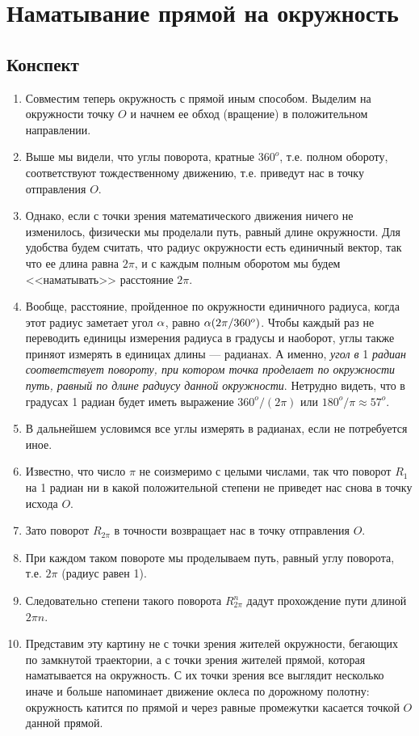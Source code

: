 \section{Наматывание прямой на окружность}

\subsection*{Конспект}
\begin{enumerate}\setlength{\itemsep}{1pt}
\item Совместим теперь окружность с прямой иным способом. Выделим на окружности точку $O$ и начнем ее обход (вращение) в положительном направлении.
\item Выше мы видели, что углы поворота, кратные $360^o$, т.е. полном обороту, соответствуют тождественному движению, т.е. приведут нас в точку отправления $O$.
\item Однако, если с точки зрения математического движения ничего не изменилось, физически мы проделали путь, равный длине окружности. Для удобства будем считать, что радиус окружности есть единичный вектор, так что ее длина равна $2\pi$, и с каждым полным оборотом мы будем <<наматывать>> расстояние $2\pi$.
\item Вообще, расстояние, пройденное по окружности единичного радиуса, когда этот радиус заметает угол $\alpha$, равно $\alpha(2\pi/360^o)$. Чтобы каждый раз не переводить единицы измерения радиуса в градусы и наоборот, углы также приняот измерять в единицах длины --- радианах. А именно, \textit{угол в} 1 \textit{радиан соответствует повороту, при котором точка проделает по окружности путь, равный по длине радиусу данной окружности}. Нетрудно видеть, что в градусах 1 радиан будет иметь выражение $360^o/(2\pi)$ или $180^o/\pi \approx 57^o$.
\item В дальнейшем условимся все углы измерять в радианах, если не потребуется иное.
\item Известно, что число $\pi$ не соизмеримо с целыми числами, так что поворот $R_1$ на 1 радиан ни в какой положительной степени не приведет нас снова в точку исхода $O$.
\item Зато поворот $R_{2\pi}$ в точности возвращает нас в точку отправления $O$.
\item При каждом таком повороте мы проделываем путь, равный углу поворота, т.е. $2\pi$ (радиус равен 1).
\item Следовательно степени такого поворота $R_{2\pi}^n$ дадут прохождение пути длиной $2\pi n$.
\item Представим эту картину не с точки зрения жителей окружности, бегающих по замкнутой траектории, а с точки зрения жителей прямой, которая наматывается на окружность. С их точки зрения все выглядит несколько иначе и больше напоминает движение оклеса по дорожному полотну: окружность катится по прямой и через равные промежутки касается точкой $O$ данной прямой.

\end{enumerate}
